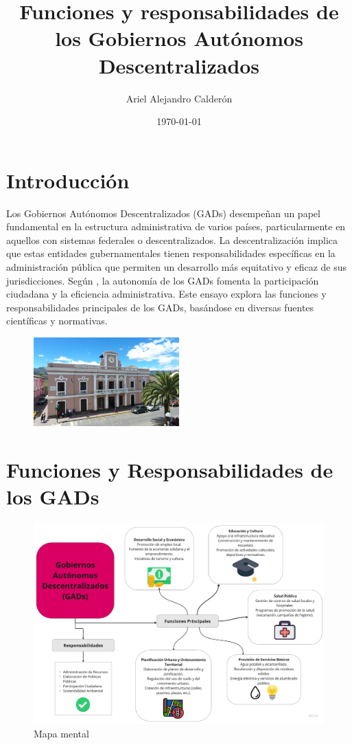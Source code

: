 \documentclass[12pt]{article}
\title{Funciones y responsabilidades de los Gobiernos Autónomos Descentralizados}
\author{Ariel Alejandro Calderón}
\date{\today}
\begin{document}
\maketitle

\section{Introducción}

Los Gobiernos Autónomos Descentralizados (GADs) desempeñan un papel fundamental en la estructura administrativa de varios países, particularmente en aquellos con sistemas federales o descentralizados. La descentralización implica que estas entidades gubernamentales tienen responsabilidades específicas en la administración pública que permiten un desarrollo más equitativo y eficaz de sus jurisdicciones. Según , la autonomía de los GADs fomenta la participación ciudadana y la eficiencia administrativa. Este ensayo explora las funciones y responsabilidades principales de los GADs, basándose en diversas fuentes científicas y normativas.

\begin{figure}[H]
    \centering
    \includegraphics[width=0.5\textwidth]{./public/g1.jpg}
    \label{fig:desarrollo}
\end{figure}
\begin{center}
\end{center}
\section{Funciones y Responsabilidades de los GADs}

\begin{figure}[H]
    \centering
    \includegraphics[width=1\textwidth]{./public/g2.png}
    \caption{Mapa mental}
    \label{fig: mapa mental}
\end{figure}
\end{document}
